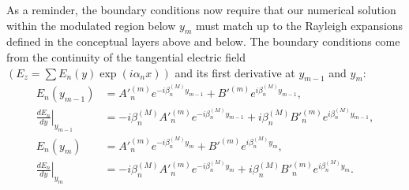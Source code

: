 As a reminder, the boundary conditions now require that our numerical solution within the modulated region below $y_m$ must match up to the Rayleigh expansions defined in the conceptual layers above and below. The boundary conditions come from the continuity of the tangential electric field $\left(E_z = \sum E_n(y) \exp{\left(i \alpha_n x\right)} \right)$ and its first derivative at $y_{m-1}$ and $y_m$:
\begin{align}
\label{eqnBounds1S}
E_n(y_{m-1}) &= A'^{(m)}_n e^{-i \beta^{(M)}_n y_{m-1}} + B'^{(m)} e^{i \beta^{(M)}_n y_{m-1}} ,\\
\label{eqnBounds2S}
\left. \frac{dE_n}{dy} \right|_{y_{m-1}} &= -i \beta^{(M)}_n A'^{(m)}_n e^{-i \beta^{(M)}_n y_{m-1}} + i \beta^{(M)}_n B'^{(m)}_n e^{i \beta^{(M)}_n y_{m-1}}  ,\\
\label{eqnBounds3S}
E_n(y_m) &= A'^{(m)}_n e^{-i \beta^{(M)}_n y_m} + B'^{(m)} e^{i \beta^{(M)}_n y_m} ,\\
\label{eqnBounds4S}
\left. \frac{dE_n}{dy} \right|_{y_m} &= -i \beta^{(M)}_n A'^{(m)}_n e^{-i \beta^{(M)}_n y_m} + i \beta^{(M)}_n B'^{(m)}_n e^{i \beta^{(M)}_n y_m}.
\end{align}


